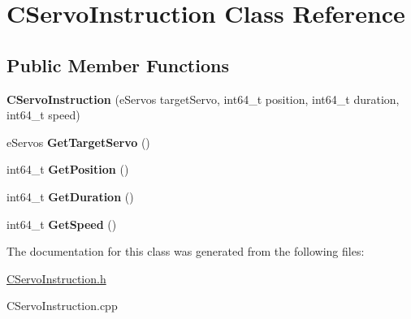 \hypertarget{classCServoInstruction}{}\section{C\+Servo\+Instruction Class Reference}
\label{classCServoInstruction}
\subsection*{Public Member Functions}
\begin{DoxyCompactItemize}
\item 
\mbox{\label{classCServoInstruction_a8c6c2780cb3fc5266e62e81166758d67}} 
{\bfseries C\+Servo\+Instruction} (e\+Servos target\+Servo, int64\+\_\+t position, int64\+\_\+t duration, int64\+\_\+t speed)
\item 
\mbox{\label{classCServoInstruction_aecfd99820d481b94e6678b99526c3083}} 
e\+Servos {\bfseries Get\+Target\+Servo} ()
\item 
\mbox{\label{classCServoInstruction_ad2f3fd01da8266d393610b46dca39679}} 
int64\+\_\+t {\bfseries Get\+Position} ()
\item 
\mbox{\label{classCServoInstruction_a3bfffbfc97fafad4a0f4bd89170e4bcc}} 
int64\+\_\+t {\bfseries Get\+Duration} ()
\item 
\mbox{\label{classCServoInstruction_a12cf1e7d297f0f5401200353d8c4c53f}} 
int64\+\_\+t {\bfseries Get\+Speed} ()
\end{DoxyCompactItemize}


The documentation for this class was generated from the following files\+:\begin{DoxyCompactItemize}
\item 
\hyperlink{CServoInstruction_8h}{C\+Servo\+Instruction.\+h}\item 
C\+Servo\+Instruction.\+cpp\end{DoxyCompactItemize}
